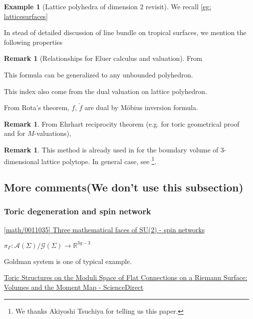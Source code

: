 \documentclass[a4paper,dvipdfmx,reqno,12pt]{amsart}
\theoremstyle{definition}
\newtheorem{Eg}[Thm]{Example}
\newtheorem{Rmk}[Thm]{Remark}
\newcommand{\R}{\mathbb{R}}%
\newcommand{\mcal}[1]{\mathcal{#1}}%
\numberwithin{equation}{section}
\begin{document}
\begin{Eg}[Lattice polyhedra of dimension $2$ revisit]
  We recall \cref{eg: latticesurfaces}

  In stead of detailed discussion of line bundle on tropical surfaces,
  we mention the following properties
\end{Eg}

\begin{Rmk}[Relationships for Eluer calculus and valuation]
  From

  This formula can be generalized to any unbounded polyhedron.

  This index also come from the dual valuation on lattice polyhedron.

  From Rota's theorem, $f$, $\check{f}$ are dual by M\"obius inversion formula.
\end{Rmk}



\begin{Rmk}
From Ehrhart reciprocity theorem (e.g. \cite[Theorem 9.4.2]{coxToricVarieties2011a} for toric geometrical proof and \cite[Theorem 2.4]{MR3971684} for $M$-valuations),
\end{Rmk}



\begin{Rmk}
This method is already used in \cite[Proposition 10.2.3]{MR2715929} for the boundary volume of 3-dimensional lattice polytope.
In general case, see \cite{MR2862314}
\footnote{We thanks Akiyoshi Tsuchiya for telling us this paper.}.
\end{Rmk}




\subsection{More comments(We don't use this subsection)}

\subsubsection{Toric degeneration and spin network}

\href{https://arxiv.org/abs/math/0011035}{[math/0011035] Three mathematical faces of SU(2) - spin networks}

$\pi_{\Gamma}\colon \mcal{A}(\Sigma)/\mcal{G}(\Sigma)\to \R^{3g-3}$

Goldman system is one of typical example.

\href{https://www.sciencedirect.com/science/article/pii/S0001870884710541}{Toric Structures on the Moduli Space of Flat Connections on a Riemann Surface: Volumes and the Moment Map - ScienceDirect}
\end{document}
